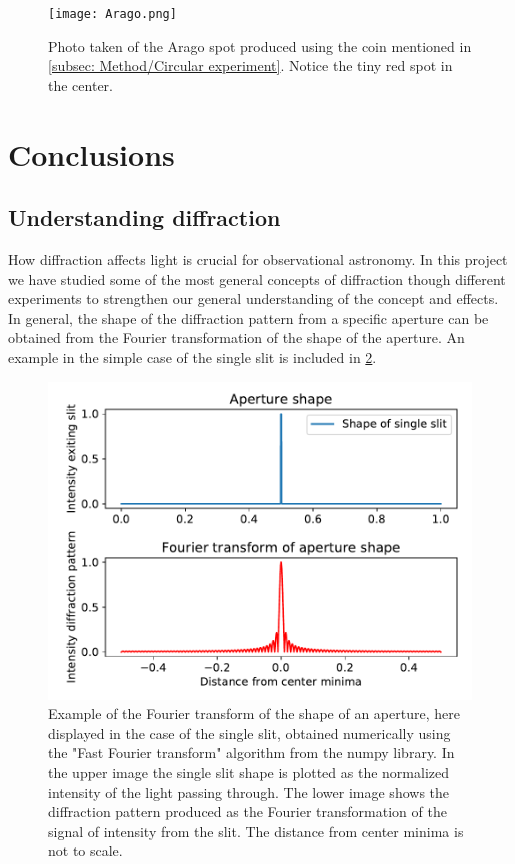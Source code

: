 \documentclass{emulateapj}
\begin{document}
\begin{figure}
\centering
\texttt{[image: Arago.png]}
\caption[Arago spot]{Photo taken of the Arago spot produced using the coin mentioned in \ref{subsec: Method/Circular experiment}. Notice the tiny red spot in the center.}
\label{fig: Arago}
\end{figure}

\section{Conclusions}
\label{sec:conclusions}
\subsection{Understanding diffraction}
How diffraction affects light is crucial for observational astronomy. In this project we have studied some of the most general concepts of diffraction though different experiments to strengthen our general understanding of the concept and effects.
In general, the shape of the diffraction pattern from a specific aperture can be obtained from the Fourier transformation of the shape of the aperture. An example in the simple case of the single slit is included in \cref{fig: FFT single}.
\begin{figure}
\centering
\includegraphics[width=\linewidth]{FFT_single_slit0.pdf}
\caption{Example of the Fourier transform of the shape of an aperture, here displayed in the case of the single slit, obtained numerically using the "Fast Fourier transform" algorithm from the numpy library. In the upper image the single slit shape is plotted as the normalized intensity of the light passing through. The lower image shows the diffraction pattern produced as the Fourier transformation of the signal of intensity from the slit. The distance from center minima is not to scale.}
\label{fig: FFT single}
\end{figure}
\end{document}
